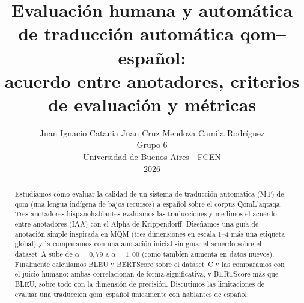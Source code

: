 \documentclass[11pt]{article}
\title{Evaluación humana y automática de traducción automática qom--español:\\
acuerdo entre anotadores, criterios de evaluación y métricas}
\author{
  Juan Ignacio Catania \quad Juan Cruz Mendoza \quad Camila Rodríguez \\
  Grupo 6 \\
  Universidad de Buenos Aires - FCEN \\
  2026
}
\begin{document}
\maketitle
\pagestyle{plain}
\thispagestyle{plain}

\begin{abstract}
Estudiamos cómo evaluar la calidad de un sistema de traducción automática (MT)
de qom (una lengua indígena de bajos recursos) a español sobre el corpus QomL'aqtaqa.
Tres anotadores hispanohablantes evaluamos las traducciones y medimos el acuerdo
entre anotadores (IAA) con el Alpha de Krippendorff. Diseñamos una guía de
anotación simple inspirada en MQM (tres dimensiones en escala 1--4 más una etiqueta
global) y la comparamos con una anotación inicial sin guía: el acuerdo sobre el
dataset~A sube de $\alpha=0{,}79$ a $\alpha=1{,}00$ (como tambíen aumenta en datos nuevos). Finalmente calculamos
BLEU y BERTScore sobre el dataset~C y las comparamos con el juicio humano: ambas
correlacionan de forma significativa, y BERTScore más que BLEU, sobre todo con la
dimensión de precisión. Discutimos las limitaciones de evaluar una traducción
qom--español únicamente con hablantes de español.
\end{abstract}









\appendix

\end{document}
